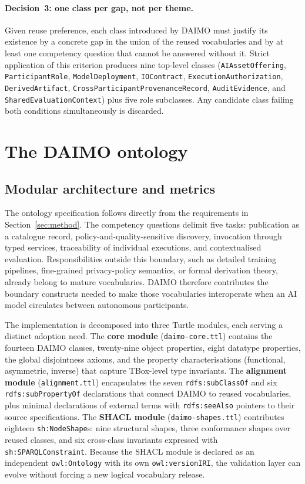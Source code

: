\documentclass[Afour,sagev,times]{sagej}
\newcommand{\code}[1]{\texttt{#1}}
\begin{document}
\paragraph{Decision~3: one class per gap, not per theme.} Given reuse preference, each class introduced by DAIMO must justify its existence by a concrete gap in the union of the reused vocabularies and by at least one competency question that cannot be answered without it. Strict application of this criterion produces nine top-level classes (\code{AIAssetOffering}, \code{ParticipantRole}, \code{ModelDeployment}, \code{IOContract}, \code{ExecutionAuthorization}, \code{DerivedArtifact}, \code{CrossParticipantProvenanceRecord}, \code{AuditEvidence}, and \code{SharedEvaluationContext}) plus five role subclasses. Any candidate class failing both conditions simultaneously is discarded.

\section{The DAIMO ontology}\label{sec:ontology}

\subsection{Modular architecture and metrics}\label{sec:scope}

The ontology specification follows directly from the requirements in Section~\ref{sec:method}. The competency questions delimit five tasks: publication as a catalogue record, policy-and-quality-sensitive discovery, invocation through typed services, traceability of individual executions, and contextualised evaluation. Responsibilities outside this boundary, such as detailed training pipelines, fine-grained privacy-policy semantics, or formal derivation theory, already belong to mature vocabularies. DAIMO therefore contributes the boundary constructs needed to make those vocabularies interoperate when an AI model circulates between autonomous participants.

The implementation is decomposed into three Turtle modules, each serving a distinct adoption need. The \textbf{core module} (\code{daimo-core.ttl}) contains the fourteen DAIMO classes, twenty-nine object properties, eight datatype properties, the global disjointness axioms, and the property characterisations (functional, asymmetric, inverse) that capture TBox-level type invariants. The \textbf{alignment module} (\code{alignment.ttl}) encapsulates the seven \code{rdfs:subClassOf} and six \code{rdfs:subPropertyOf} declarations that connect DAIMO to reused vocabularies, plus minimal declarations of external terms with \code{rdfs:seeAlso} pointers to their source specifications. The \textbf{SHACL module} (\code{daimo-shapes.ttl}) contributes eighteen \code{sh:NodeShape}s: nine structural shapes, three conformance shapes over reused classes, and six cross-class invariants expressed with \code{sh:SPARQLConstraint}. Because the SHACL module is declared as an independent \code{owl:Ontology} with its own \code{owl:versionIRI}, the validation layer can evolve without forcing a new logical vocabulary release.
\end{document}
